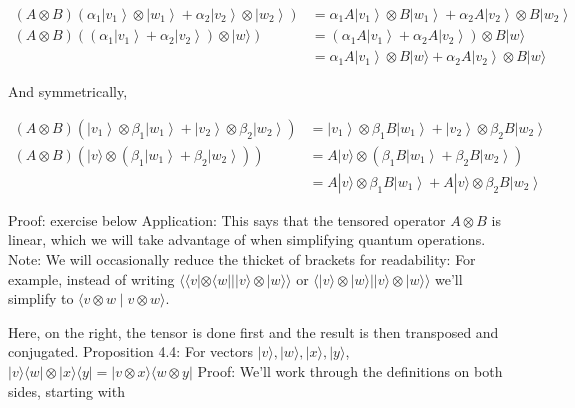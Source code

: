 \documentclass[main.tex]{subfiles}
\begin{document}
    $$
    \begin{aligned}
    (A \otimes B)\left(\alpha_{1}\left|v_{1}\right\rangle \otimes\left|w_{1}\right\rangle+\alpha_{2}\left|v_{2}\right\rangle \otimes\left|w_{2}\right\rangle\right) &=\alpha_{1} A\left|v_{1}\right\rangle \otimes B\left|w_{1}\right\rangle+\alpha_{2} A\left|v_{2}\right\rangle \otimes B\left|w_{2}\right\rangle \\
    (A \otimes B)\left(\left(\alpha_{1}\left|v_{1}\right\rangle+\alpha_{2}\left|v_{2}\right\rangle\right) \otimes|w\rangle\right) &=\left(\alpha_{1} A\left|v_{1}\right\rangle+\alpha_{2} A\left|v_{2}\right\rangle\right) \otimes B|w\rangle \\
    &=\alpha_{1} A\left|v_{1}\right\rangle \otimes B|w\rangle+\alpha_{2} A\left|v_{2}\right\rangle \otimes B|w\rangle
    \end{aligned}
    $$
    
    And symmetrically,
   
    $$
    \begin{aligned}
    (A \otimes B)\left(\left|v_{1}\right\rangle \otimes \beta_{1}\left|w_{1}\right\rangle+\left|v_{2}\right\rangle \otimes \beta_{2}\left|w_{2}\right\rangle\right) &=\left|v_{1}\right\rangle \otimes \beta_{1} B\left|w_{1}\right\rangle+\left|v_{2}\right\rangle \otimes \beta_{2} B\left|w_{2}\right\rangle \\
    (A \otimes B)\left(|v\rangle \otimes\left(\beta_{1}\left|w_{1}\right\rangle+\beta_{2}\left|w_{2}\right\rangle\right)\right) &=A|v\rangle \otimes\left(\beta_{1} B\left|w_{1}\right\rangle+\beta_{2} B\left|w_{2}\right\rangle\right) \\
    &=A|v\rangle \otimes \beta_{1} B\left|w_{1}\right\rangle+A|v\rangle \otimes \beta_{2} B\left|w_{2}\right\rangle
    \end{aligned}
    $$
    
    Proof: exercise below Application: This says that the tensored operator $A \otimes B$ is linear, which we will take advantage of when simplifying quantum operations. Note: We will occasionally reduce the thicket of brackets for readability: For example, instead of writing $\langle\langle v|\otimes\langle w|| \mid v\rangle \otimes| w\rangle\rangle$ or $\langle\mid v\rangle \otimes|w\rangle|| v\rangle \otimes|w\rangle\rangle$ we'll simplify to $\langle v \otimes w \mid v \otimes w\rangle$.
    
    Here, on the right, the tensor is done first and the result is then transposed and conjugated. Proposition 4.4: For vectors $|v\rangle,|w\rangle,|x\rangle,|y\rangle$, $|v\rangle\langle w|\otimes| x\rangle\langle y|=| v \otimes x\rangle\langle w \otimes y|$ Proof: We'll work through the definitions on both sides, starting with
    
\end{document}
